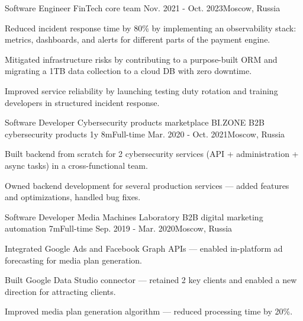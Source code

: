 \begin{cventries}
  \cventry
    {Software Engineer} %
    {FinTech core team} %
    {} %
    {} %
    {} %
    {Nov. 2021 - Oct. 2023{\enskip\cdotp\enskip}Moscow, Russia} %
    {
      \begin{cvitems} %
        \item {Reduced incident response time by 80\% by implementing an observability stack: metrics, dashboards, and alerts for different parts of the payment engine.}
        \item {Mitigated infrastructure risks by contributing to a purpose-built ORM and migrating a 1TB data collection to a cloud DB with zero downtime.}
        \item {Improved service reliability by launching testing duty rotation and training developers in structured incident response.}
      \end{cvitems}
    }

  \cventry
    {Software Developer} %
    {Cybersecurity products marketplace} %
    {BI.ZONE} %
    {B2B cybersecurity products} %
    {1y 8m{\enskip\cdotp\enskip}Full-time} %
    {Mar. 2020 - Oct. 2021{\enskip\cdotp\enskip}Moscow, Russia} %
    {
      \begin{cvitems} %
        \item {Built backend from scratch for 2 cybersecurity services (API + administration + async tasks) in a cross-functional team.}
        \item {Owned backend development for several production services — added features and optimizations, handled bug fixes.}
      \end{cvitems}
    }

  \cventry
    {Software Developer} %
    {} %
    {Media Machines Laboratory} %
    {B2B digital marketing automation} %
    {7m{\enskip\cdotp\enskip}Full-time} %
    {Sep. 2019 - Mar. 2020{\enskip\cdotp\enskip}Moscow, Russia} %
    {
      \begin{cvitems} %
        \item {Integrated Google Ads and Facebook Graph APIs — enabled in-platform ad forecasting for media plan generation.}
        \item {Built Google Data Studio connector — retained 2 key clients and enabled a new direction for attracting clients.}
        \item {Improved media plan generation algorithm — reduced processing time by 20\%.}
      \end{cvitems}
    }


\end{cventries}
